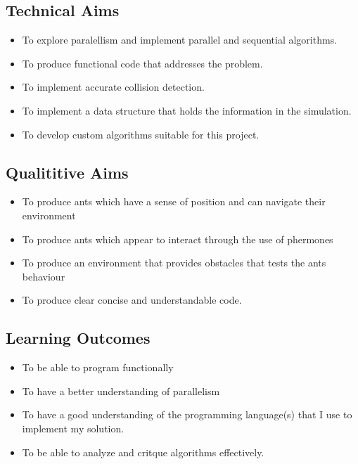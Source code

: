 \documentclass{report}
\begin{document}
\subsection{Technical Aims}
\begin{itemize}
	\item To explore paralellism and implement parallel and sequential algorithms.
	\item To produce functional code that addresses the problem.
	\item To implement accurate collision detection.
	\item To implement a data structure that holds the information in the simulation.
	\item To develop custom algorithms suitable for this project.
\end{itemize}

\subsection{Qualititive Aims}
\begin{itemize}
	\item To produce ants which have a sense of  position and can navigate their environment
	\item To produce ants which appear to interact through the use of phermones
	\item To produce an environment that provides obstacles that tests the ants behaviour
	\item To produce clear concise and understandable code.
\end{itemize}

\subsection{Learning Outcomes}
\begin{itemize}
	\item To be able to program functionally
	\item To have a better understanding of parallelism
	\item To have a good understanding of the programming language(s) that I use to implement my solution.
	\item To be able to analyze and critque algorithms effectively.
\end{itemize}
\end{document}
